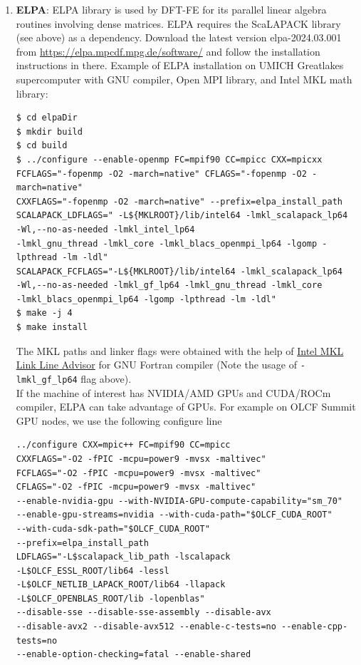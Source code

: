 \begin{enumerate}
\item {\bf ELPA}: ELPA library is used by DFT-FE for its parallel linear algebra routines involving dense matrices. ELPA requires the ScaLAPACK library (see above) as a dependency. Download the latest version elpa-2024.03.001 from \url{https://elpa.mpcdf.mpg.de/software/} and follow the installation instructions in there. Example of ELPA installation on UMICH Greatlakes supercomputer with GNU compiler, Open MPI library, and Intel MKL math library:
\begin{verbatim}
$ cd elpaDir
$ mkdir build
$ cd build
$ ../configure --enable-openmp FC=mpif90 CC=mpicc CXX=mpicxx 
FCFLAGS="-fopenmp -O2 -march=native" CFLAGS="-fopenmp -O2 -march=native" 
CXXFLAGS="-fopenmp -O2 -march=native" --prefix=elpa_install_path
SCALAPACK_LDFLAGS=" -L${MKLROOT}/lib/intel64 -lmkl_scalapack_lp64
-Wl,--no-as-needed -lmkl_intel_lp64
-lmkl_gnu_thread -lmkl_core -lmkl_blacs_openmpi_lp64 -lgomp -lpthread -lm -ldl" 
SCALAPACK_FCFLAGS="-L${MKLROOT}/lib/intel64 -lmkl_scalapack_lp64
-Wl,--no-as-needed -lmkl_gf_lp64 -lmkl_gnu_thread -lmkl_core
-lmkl_blacs_openmpi_lp64 -lgomp -lpthread -lm -ldl"
$ make -j 4
$ make install
\end{verbatim}
The MKL paths and linker flags were obtained with the help of \href{https://software.intel.com/en-us/articles/intel-mkl-link-line-advisor}{Intel MKL Link Line Advisor} for GNU Fortran compiler (Note the usage of \verb|-lmkl_gf_lp64| flag above).\\ 

If the machine of interest has NVIDIA/AMD GPUs and CUDA/ROCm compiler, ELPA can take advantage of GPUs. For example on OLCF Summit GPU nodes, we use the following configure line
\begin{verbatim}
../configure CXX=mpic++ FC=mpif90 CC=mpicc 
CXXFLAGS="-O2 -fPIC -mcpu=power9 -mvsx -maltivec"
FCFLAGS="-O2 -fPIC -mcpu=power9 -mvsx -maltivec" 
CFLAGS="-O2 -fPIC -mcpu=power9 -mvsx -maltivec"
--enable-nvidia-gpu --with-NVIDIA-GPU-compute-capability="sm_70" 
--enable-gpu-streams=nvidia --with-cuda-path="$OLCF_CUDA_ROOT"
--with-cuda-sdk-path="$OLCF_CUDA_ROOT" 
--prefix=elpa_install_path 
LDFLAGS="-L$scalapack_lib_path -lscalapack  
-L$OLCF_ESSL_ROOT/lib64 -lessl 
-L$OLCF_NETLIB_LAPACK_ROOT/lib64 -llapack 
-L$OLCF_OPENBLAS_ROOT/lib -lopenblas"
--disable-sse --disable-sse-assembly --disable-avx 
--disable-avx2 --disable-avx512 --enable-c-tests=no --enable-cpp-tests=no
--enable-option-checking=fatal --enable-shared 
\end{verbatim}



\end{enumerate}
